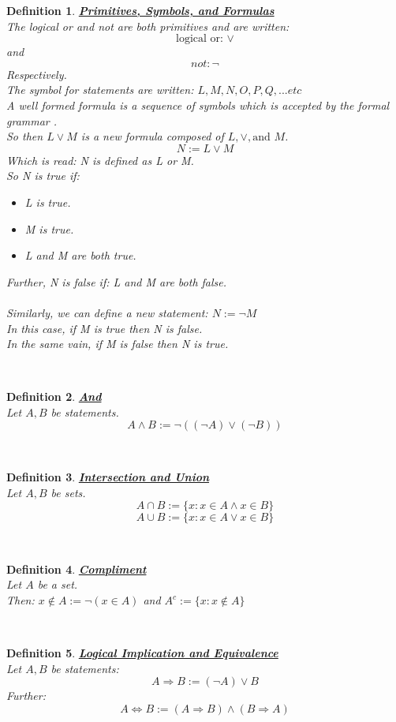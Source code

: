 \documentclass[12pt]{extarticle}
\theoremstyle{plain}
\theoremstyle{plain}
\theoremstyle{plain}
\theoremstyle{Definition}
\newtheorem{def.}{Definition}[section]
\theoremstyle{Definition}
\theoremstyle{plain}
\theoremstyle{plain}
\newcommand{\cut}[0]{\noindent\framebox[\linewidth]{\rule{\linewidth}{2pt}}\\}
\begin{document}
\begin{def.} \underline{\textbf{Primitives, Symbols, and Formulas}} \\
	The logical or and not are both primitives and are written: \\ 
	$$\text{logical or: }\lor$$ 
	and 
	$$not: \lnot$$
	Respectively. \\
	The symbol for statements are written: $L,M,N,O,P,Q,... etc$ \\
	A well formed formula is a sequence of symbols which is accepted by the formal grammar . \\
	So then $L \lor M$ is a new formula composed of $L,\lor,\text{and } M$. \\
	$$N := L \lor M$$
	Which is read: N is defined as L or M. \\
	So N is true if: 
	\begin{itemize}
		\item 	L is true. 
		\item M is true.
		\item L and M are both true. 
	\end{itemize}
	Further, N is false if: 
	L and M are both false. \\ \\
	Similarly, we can define a new statement: $N := \lnot M$ \\
	In this case, if M is true then N is false. \\
	In the same vain, if M is false then N is true. 
\end{def.}
\cut
\begin{def.} \underline{\textbf{And}} \\
	Let $A,B$ be statements. \\ 
	$$A \land B := \lnot((\lnot A) \lor (\lnot B))$$ 
\end{def.}
\cut
\begin{def.} \underline{\textbf{Intersection and Union}} \\
	Let $A,B$ be sets. \\ 
	$$A \cap B := \{ x : x \in A \land x \in B\}$$
	$$A \cup B := \{ x : x \in A \lor x \in B\}$$
\end{def.}
\cut
\begin{def.} \underline{\textbf{Compliment}} \\ 
	Let $A$ be a set.  \\
	Then: $x \not \in A := \lnot(x \in A)$ and 
	$A^c := \{x : x \not \in A\}$
\end{def.}
\cut
\begin{def.} \underline{\textbf{Logical Implication and Equivalence}} \\
	Let $A,B$ be statements: 
	$$A \Rightarrow B := (\lnot A) \lor B$$
	Further: 
	$$A \Leftrightarrow B := (A \Rightarrow B) \wedge (B \Rightarrow A)$$
\end{def.}
\end{document}
